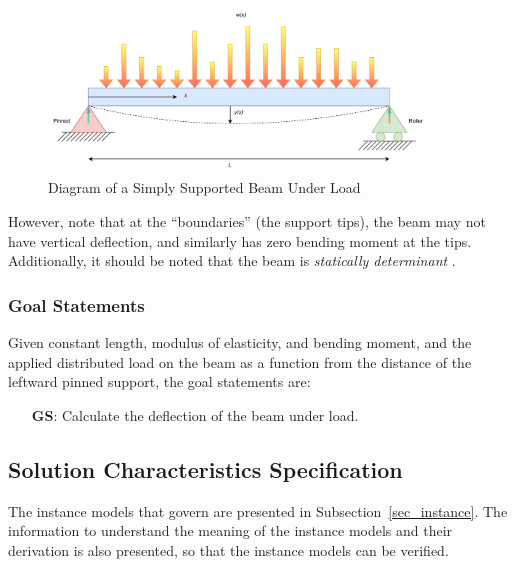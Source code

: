 \documentclass[12pt]{article}
\newcounter{goalnum} %
\begin{document}
\begin{figure}[H]
    \begin{center}
        \includegraphics[width=0.9\textwidth]{diagrams/beam_bending_diagram_annotated.drawio.pdf}
        \caption{\label{beam_bending_diagram_annotated} Diagram of a Simply Supported Beam Under Load}
    \end{center}
\end{figure}

\noindent{}However, note that at the ``boundaries'' (the support tips), the beam
may not have vertical deflection, and similarly has zero bending moment at the
tips. Additionally, it should be noted that the beam is \textit{statically
    determinant} \cite{StaticallyDeterminantWiki}.

\subsubsection{Goal Statements}
\label{sssec_goals}

\noindent{}Given constant length, modulus of elasticity, and bending moment, and
the applied distributed load on the beam as a function from the distance of the
leftward pinned support, the goal statements are:

\begin{itemize}

    \item[\refstepcounter{goalnum}\textbf{GS\thegoalnum{}}\label{deflection}:]
        Calculate the deflection of the beam under load.

\end{itemize}

\subsection{Solution Characteristics Specification}

The instance models that govern \progname{} are presented in
Subsection~\ref{sec_instance}.  The information to understand the meaning of the
instance models and their derivation is also presented, so that the instance
models can be verified.
\end{document}
